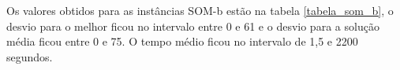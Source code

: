 \documentclass[12pt]{article}
\begin{document}
Os valores obtidos para as instâncias SOM-b estão na tabela \ref{tabela_som_b}, o desvio para o melhor ficou no intervalo entre 0 e 61 e o desvio para a solução média ficou entre 	0 e 75. O tempo médio ficou no intervalo de 1,5 e 2200 segundos.








\end{document}
